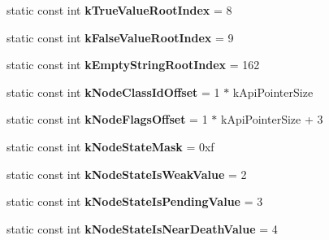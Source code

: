 \begin{DoxyCompactItemize}
\item 
\hypertarget{classv8_1_1internal_1_1Internals_a93abd58b178eca469bade28e68b5c59e}{static const int {\bfseries k\-True\-Value\-Root\-Index} = 8}\label{classv8_1_1internal_1_1Internals_a93abd58b178eca469bade28e68b5c59e}

\item 
\hypertarget{classv8_1_1internal_1_1Internals_a90b6837aa368bbe4ffd914e6f753b167}{static const int {\bfseries k\-False\-Value\-Root\-Index} = 9}\label{classv8_1_1internal_1_1Internals_a90b6837aa368bbe4ffd914e6f753b167}

\item 
\hypertarget{classv8_1_1internal_1_1Internals_a6f669f3d98fe653b281b26be3bc0655a}{static const int {\bfseries k\-Empty\-String\-Root\-Index} = 162}\label{classv8_1_1internal_1_1Internals_a6f669f3d98fe653b281b26be3bc0655a}

\item 
\hypertarget{classv8_1_1internal_1_1Internals_af4fb6d499cb87f03031ad4d6be6bcd8f}{static const int {\bfseries k\-Node\-Class\-Id\-Offset} = 1 $\ast$ k\-Api\-Pointer\-Size}\label{classv8_1_1internal_1_1Internals_af4fb6d499cb87f03031ad4d6be6bcd8f}

\item 
\hypertarget{classv8_1_1internal_1_1Internals_aee5606f2a44d43d8dafe344e0bb753ef}{static const int {\bfseries k\-Node\-Flags\-Offset} = 1 $\ast$ k\-Api\-Pointer\-Size + 3}\label{classv8_1_1internal_1_1Internals_aee5606f2a44d43d8dafe344e0bb753ef}

\item 
\hypertarget{classv8_1_1internal_1_1Internals_a853acc088978d38a5a69091cf857a46d}{static const int {\bfseries k\-Node\-State\-Mask} = 0xf}\label{classv8_1_1internal_1_1Internals_a853acc088978d38a5a69091cf857a46d}

\item 
\hypertarget{classv8_1_1internal_1_1Internals_a8a5d4cc92a6952c2a50922c77a606e68}{static const int {\bfseries k\-Node\-State\-Is\-Weak\-Value} = 2}\label{classv8_1_1internal_1_1Internals_a8a5d4cc92a6952c2a50922c77a606e68}

\item 
\hypertarget{classv8_1_1internal_1_1Internals_a843b53b17257ecd957eade0d9f21c5ab}{static const int {\bfseries k\-Node\-State\-Is\-Pending\-Value} = 3}\label{classv8_1_1internal_1_1Internals_a843b53b17257ecd957eade0d9f21c5ab}

\item 
\hypertarget{classv8_1_1internal_1_1Internals_a18f3e757639b07bdabb8cda7dd4a8bdb}{static const int {\bfseries k\-Node\-State\-Is\-Near\-Death\-Value} = 4}\label{classv8_1_1internal_1_1Internals_a18f3e757639b07bdabb8cda7dd4a8bdb}


\end{DoxyCompactItemize}
